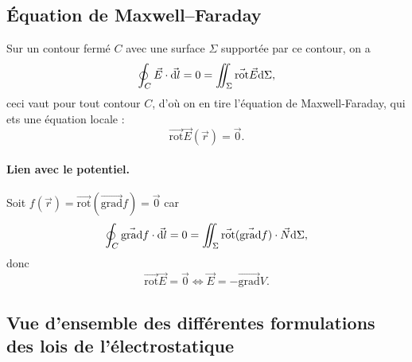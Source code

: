     \subsection{Équation de Maxwell--Faraday}

        Sur un contour fermé $C$ avec une surface $\Sigma$ supportée par ce contour, on a 
        \begin{equation}
            \oint_{C}\vec{E}\cdot\vec{\mathrm{d} l}=0=\iint_{\Sigma}\vec{\mathrm{rot}}\vec{E}\mathrm{d}\Sigma,
        \end{equation}
        ceci vaut pour tout contour $C$, d'où on en tire l'équation de Maxwell-Faraday, qui ets une équation locale :
        \begin{equation}
            \boxed{
                \vec{\mathrm{rot}}\vec{E}(\vec{r})=\vec{0}.
            }
        \end{equation}

        \paragraph{Lien avec le potentiel.}

            Soit $f(\vec{r})=\vec{\mathrm{rot}}(\vec{\mathrm{grad}}f)=\vec{0}$ car
            \begin{equation}
                \oint_{C}\vec{\mathrm{grad}}f\cdot\vec{\mathrm{d} l}=0=\iint_{\Sigma}\vec{\mathrm{rot}}(\vec{\mathrm{grad}}f)\cdot\vec{N}\mathrm{d}\Sigma,
            \end{equation}
            donc
            \begin{equation}
                \boxed{
                    \vec{\mathrm{rot}}\vec{E}=\vec{0}\Longleftrightarrow\vec{E}=-\vec{\mathrm{grad}}V.
                }
            \end{equation}

    \subsection{Vue d'ensemble des différentes formulations des lois de l'électrostatique}

